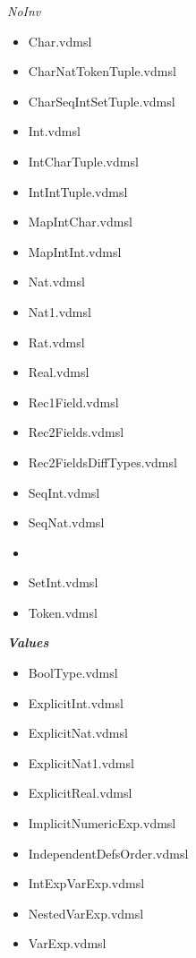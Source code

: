 \begin{multicols}{2}
\emph{NoInv}
\begin{itemize}
\item Char.vdmsl
\item CharNatTokenTuple.vdmsl
\item CharSeqIntSetTuple.vdmsl
\item Int.vdmsl
\item IntCharTuple.vdmsl
\item IntIntTuple.vdmsl
\item MapIntChar.vdmsl
\item MapIntInt.vdmsl
\item Nat.vdmsl
\item Nat1.vdmsl
\item Rat.vdmsl
\item Real.vdmsl
\item Rec1Field.vdmsl
\item Rec2Fields.vdmsl
\item Rec2FieldsDiffTypes.vdmsl
\item SeqInt.vdmsl
\item SeqNat.vdmsl
\item \item SetInt.vdmsl
\item Token.vdmsl
\end{itemize}
\textbf{\emph{Values}}
\begin{itemize}
\item BoolType.vdmsl
\item ExplicitInt.vdmsl
\item ExplicitNat.vdmsl
\item ExplicitNat1.vdmsl
\item ExplicitReal.vdmsl
\item ImplicitNumericExp.vdmsl
\item IndependentDefsOrder.vdmsl
\item IntExpVarExp.vdmsl
\item NestedVarExp.vdmsl
\item VarExp.vdmsl
\end{itemize}
\end{multicols}
